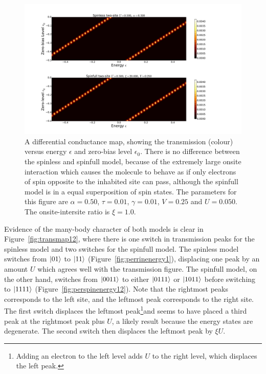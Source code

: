 \begin{figure}[htb]
    \centering
    \includegraphics[height=.38\textheight]{pdf/map/transmap_u3_k4.pdf}
    \caption{A differential conductance map, showing the transmission (colour) versus energy $\epsilon$ and zero-bias level $\epsilon_0$. There is no difference between the spinless and spinfull model, because of the extremely large onsite interaction which causes the molecule to behave as if only electrons of spin opposite to the inhabited site can pass, although the spinfull model is in a equal superposition of spin states. The parameters for this figure are $\alpha=0.50$, $\tau=0.01$, $\gamma=0.01$, $V=0.25$ and $U=0.050$. The onsite-intersite ratio is $\xi=1.0$.}
    \label{fig:transmap34}
\end{figure}

Evidence of the many-body character of both models is clear in Figure~\ref{fig:transmap12}, where there is one switch in transmission peaks for the spinless model and two switches for the spinfull model. The spinless model switches from $\ket{01}$ to $\ket{11}$ (Figure~\ref{fig:perrinenergy1}), displacing one peak by an amount $U$ which agrees well with the transmission figure.  The spinfull model, on the other hand, switches from $\ket{0011}$ to either $\ket{0111}$ or $\ket{1011}$ before switching to $\ket{1111}$ (Figure~\ref{fig:perspinenergy12}). Note that the rightmost peaks corresponds to the left site, and the leftmost peak corresponds to the right site. The first switch displaces the leftmost peak\footnote{Adding an electron to the left level adds $U$ to the right level, which displaces the left peak.}and seems to have placed a third peak at the rightmost peak plus $U$, a likely result because the energy states are degenerate. The second switch then displaces the leftmost peak by $\xi U$. 
 

